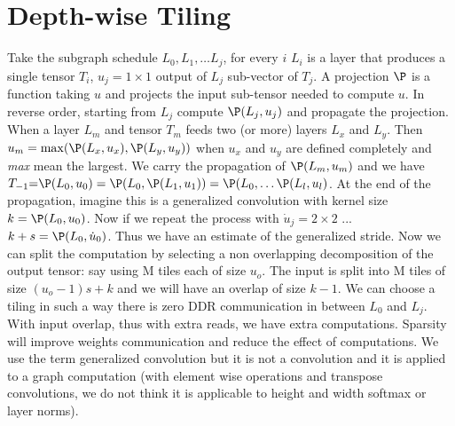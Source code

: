 \documentclass{IEEEtran}
\begin{document}
\section{Depth-wise Tiling}
Take the subgraph schedule $L_0, L_1, \dots L_j$, for every $i$ $L_i$
is a layer that produces a single tensor $T_i$, $u_j=1\times1$ output
of $L_j$ sub-vector of $T_j$. A projection $\P$ is a function taking
$u$ and projects the input sub-tensor needed to compute $u$.  In
reverse order, starting from $L_j$ compute $\P(L_j,u_j)$ and propagate
the projection. When a layer $L_m$ and tensor $T_m$ feeds two (or
more) layers $L_x$ and $L_y$. Then $u_m = \max (
\P(L_x,u_x),\P(L_y,u_y))$ when $u_x$ and $u_y$ are defined completely
and {\em max} mean the largest. We carry the propagation of
$\P(L_m,u_m)$ and we have $T_{-1} \eq \P(L_0, u_0) = \P(L_0, \P(L_1,
u_1))= \P(L_0, \dots \P(L_l, u_l)$. At the end of the propagation,
imagine this is a generalized convolution with kernel size $k =
\P(L_0, u_0)$. Now if we repeat the process with $\dot{u}_j = 2\times
2$ ... $k+s = \P(L_0, \dot{u}_0)$. Thus we have an estimate of the
generalized stride.  Now we can split the computation by selecting a
non overlapping decomposition of the output tensor: say using M tiles
each of size $u_o$. The input is split into M tiles of size
$(u_o-1)s+k$ and we will have an overlap of size $k-1$. We can choose
a tiling in such a way there is zero DDR communication in between
$L_0$ and $L_j$.  With input overlap, thus with extra reads, we have
extra computations. Sparsity will improve weights communication and
reduce the effect of computations. We use the term generalized
convolution but it is not a convolution and it is applied to a graph
computation (with element wise operations and transpose convolutions,
we do not think it is applicable to height and width softmax or layer
norms).


\end{document}
